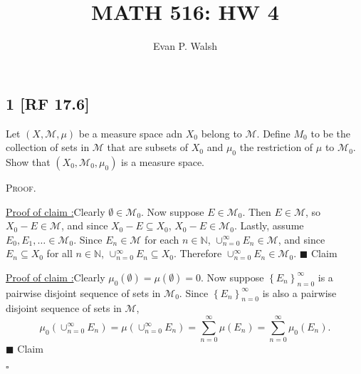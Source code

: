 \documentclass[12pt]{article}
\title{MATH 516: HW 4}
\author{Evan P. Walsh}
\newcounter{ProofCounter}
\newcounter{ClaimCounter}[ProofCounter]
\newenvironment{Proof}{\stepcounter{ProofCounter}\textsc{Proof.}}{\hfill$\square$}
\newenvironment{claim}[1]{\vspace{1mm}\stepcounter{ClaimCounter}\par\noindent\underline{\bf Claim \theClaimCounter:}\space#1}{}
\newenvironment{claimproof}[1]{\par\noindent\underline{Proof of claim \theClaimCounter:}\space#1}{\hfill $\blacksquare$ Claim \theClaimCounter}
\begin{document}
\maketitle

\subsection*{1 [RF 17.6]}
\begin{tcolorbox}
Let $(X, \mathcal{M}, \mu)$ be a measure space adn $X_{0}$ belong to $\mathcal{M}$. Define $M_{0}$ to be the collection of sets in $\mathcal{M}$ that
are subsets of $X_{0}$ and $\mu_{0}$ the restriction of $\mu$ to $\mathcal{M}_{0}$. Show that $(X_{0}, \mathcal{M}_{0}, \mu_{0})$ is a measure space.
\end{tcolorbox}
\begin{Proof}

\begin{claimproof}
Clearly $\emptyset \in \mathcal{M}_{0}$. Now suppose $E \in \mathcal{M}_{0}$. Then $E \in \mathcal{M}$, so $X_{0} - E \in \mathcal{M}$, and since
$X_{0} - E \subseteq X_{0}$, $X_{0} - E \in \mathcal{M}_{0}$. Lastly, assume $E_{0}, E_{1}, \hdots \in \mathcal{M}_{0}$. Since $E_{n} \in \mathcal{M}$
for each $n \in \mathbb{N}$, $\cup_{n=0}^{\infty}E_{n} \in \mathcal{M}$, and since $E_{n} \subseteq X_{0}$ for all $n \in \mathbb{N}$,
$\cup_{n=0}^{\infty}E_{n}\subseteq X_{0}$. Therefore $\cup_{n=0}^{\infty}E_{n} \in \mathcal{M}_{0}$.
\end{claimproof}

\begin{claimproof}
Clearly $\mu_{0}(\emptyset) = \mu(\emptyset) = 0$. Now suppose $\left\{ E_{n} \right\}_{n=0}^{\infty}$ is a pairwise disjoint sequence of sets in
$\mathcal{M}_{0}$. Since $\left\{ E_{n} \right\}_{n=0}^{\infty}$ is also a pairwise disjoint sequence of sets in $\mathcal{M}$,
\[ \mu_{0}\left( \cup_{n=0}^{\infty}E_{n} \right) = \mu\left( \cup_{n=0}^{\infty}E_{n} \right) = \sum_{n=0}^{\infty}\mu(E_{n}) =
\sum_{n=0}^{\infty}\mu_{0}(E_{n}). \]
\end{claimproof}

\end{Proof}

\newpage
\end{document}
